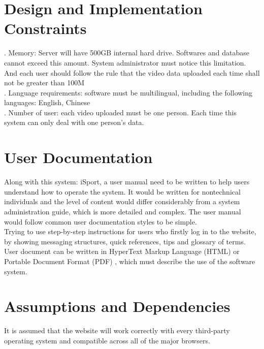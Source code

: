 \documentclass[16pt]{scrreprt}
\begin{document}
 
\section{Design and Implementation Constraints}

 
. Memory: Server will have 500GB internal hard drive. Softwares and database cannot exceed this amount. System administrator must notice this limitation. And each user should follow the rule that the video data uploaded each time shall not be greater than 100M\\

 
. Language requirements: software must be multilingual, including the following languages: English, Chinese\\

 
. Number of user: each video uploaded must be one person. Each time this system can only deal with one person's data.\\

 
\section{User Documentation}

 
Along with this system: iSport, a user manual need to be written to help users understand how to operate the system. It would be written for nontechnical individuals and the level of content would differ considerably from a system administration guide, which is more detailed and complex. The user manual would follow common user documentation styles to be simple.\\

 
Trying to use step-by-step instructions for users who firstly log in to the website, by showing messaging structures, quick references, tips and glossary of terms.\\

 
User document can be written in HyperText Markup Language (HTML) or Portable Document Format (PDF) , which must describe the use of the software system.

 
\section{Assumptions and Dependencies}

 
It is assumed that the website will work correctly with every third-party operating
system and compatible across all of the major browsers.\\
\end{document}
